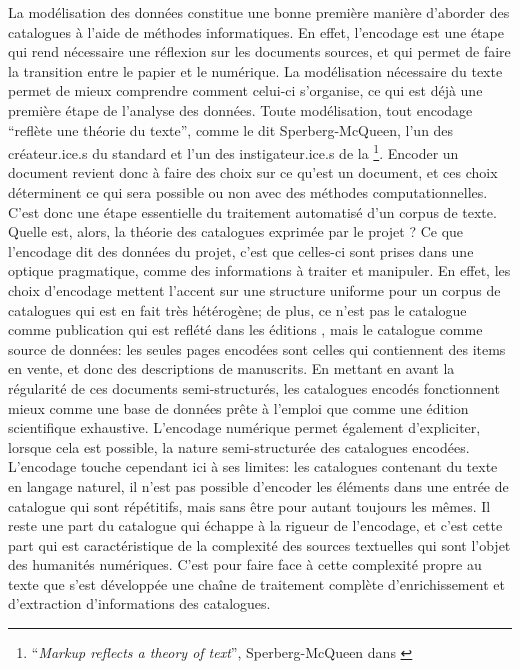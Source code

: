 La modélisation des données constitue une bonne première manière d'aborder des catalogues à l'aide de méthodes informatiques. En effet, l'encodage est une étape qui rend nécessaire une réflexion sur les documents sources, et qui permet de faire la transition entre le papier et le numérique. La modélisation nécessaire du texte permet de mieux comprendre comment celui-ci s'organise, ce qui est déjà une première étape de l'analyse des données. Toute modélisation, tout encodage \enquote{reflète une théorie du texte}, comme le dit Sperberg-McQueen, l'un des créateur.ice.s du standard \xml{} et l'un des instigateur.ice.s de la \tei{}\footnote{\enquote{\textit{Markup reflects a theory of text}}, Sperberg-McQueen dans \cite{renear_refining_1996}}. Encoder un document revient donc à faire des choix sur ce qu'est un document, et ces choix déterminent ce qui sera possible ou non avec des méthodes computationnelles. C'est donc une étape essentielle du traitement automatisé d'un corpus de texte. Quelle est, alors, la théorie des catalogues exprimée par le projet \mssktb{}? Ce que l'encodage dit des données du projet, c'est que celles-ci sont prises dans une optique pragmatique, comme des informations à traiter et manipuler. En effet, les choix d'encodage mettent l'accent sur une structure uniforme pour un corpus de catalogues qui est en fait très hétérogène; de plus, ce n'est pas le catalogue comme publication qui est reflété dans les éditions \xmltei{}, mais le catalogue comme source de données: les seules pages encodées sont celles qui contiennent des items en vente, et donc des descriptions de manuscrits. En mettant en avant la régularité de ces documents semi-structurés, les catalogues encodés fonctionnent mieux comme une base de données prête à l'emploi que comme une édition scientifique exhaustive. L'encodage numérique permet également d'expliciter, lorsque cela est possible, la nature semi-structurée des catalogues encodées. L'encodage touche cependant ici à ses limites: les catalogues contenant du texte en langage naturel, il n'est pas possible d'encoder les éléments dans une entrée de catalogue qui sont répétitifs, mais sans être pour autant toujours les mêmes. Il reste une part du catalogue qui échappe à la rigueur de l'encodage, et c'est cette part qui est caractéristique de la complexité des sources textuelles qui sont l'objet des humanités numériques. C'est pour faire face à cette complexité propre au texte que s'est développée une chaîne de traitement complète d'enrichissement et d'extraction d'informations des catalogues.


